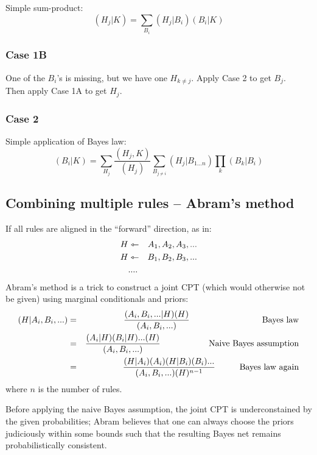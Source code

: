 Simple sum-product:
$$ (H_j|K) = \sum_{B_i} (H_j|B_i)(B_i|K) $$

\subsubsection{Case 1B}

One of the $B_i$'s is missing, but we have one $H_{k \neq j}$.  Apply Case 2 to get $B_j$.\\
Then apply Case 1A to get $H_j$.

\subsubsection{Case 2}

Simple application of Bayes law:
\begin{equation}
\label{eqn:apply-Bayes-law}
 (B_i|K) = \sum_{H_j} \frac{(H_j,K)}{(H_j)}
           \sum_{B_{j \neq i}} (H_j|B_{1...n}) \prod_k (B_k|B_i)
\end{equation}

\subsection{Combining multiple rules -- Abram's method}

If all rules are aligned in the ``forward'' direction, as in:
\begin{eqnarray}
H &\leftarrowtriangle& A_1, A_2, A_3, ... \nonumber \\
H &\leftarrowtriangle& B_1, B_2, B_3, ... \nonumber \\
  & .... &                    \nonumber
\end{eqnarray}
Abram's method is a trick to construct a joint CPT (which would otherwise not be given) using
marginal conditionals and priors:
\begin{eqnarray}
(H|A_i,B_i,...) &=& \frac{ (A_i,B_i,...|H)(H) } { (A_i,B_i,...) } \tab\tab\tab \mbox{Bayes law} \nonumber \\
 &=& \frac{ (A_i|H) (B_i|H) ... (H) }{ (A_i,B_i,...) } \tab\tab \mbox{Naive Bayes assumption} \nonumber \\
 &=& \frac{ (H|A_i) (A_i) (H|B_i) (B_i) ... }{ (A_i,B_i,...) (H)^{n-1} } \tab \mbox{Bayes law again} \nonumber
\end{eqnarray}
where $n$ is the number of rules.

Before applying the naive Bayes assumption, the joint CPT is underconstained by the given
probabilities;  Abram believes that one can always choose the priors judiciously within some
bounds such that the resulting Bayes net remains probabilistically consistent.

